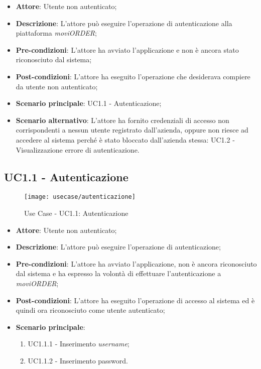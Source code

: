 \begin{itemize}
	\item \textbf{Attore}: Utente non autenticato;
	\item \textbf{Descrizione}: L'attore può eseguire l'operazione di autenticazione alla piattaforma \textit{moviORDER};
	\item \textbf{Pre-condizioni}: L'attore ha avviato l'applicazione e non è ancora stato riconosciuto dal sistema;
	\item \textbf{Post-condizioni}: L'attore ha eseguito l'operazione che desiderava compiere da utente non autenticato;
	\item \textbf{Scenario principale}: UC1.1 - Autenticazione;
	\item \textbf{Scenario alternativo}: L'attore ha fornito credenziali di accesso non corrispondenti a nessun utente registrato dall'azienda, oppure non riesce ad accedere al sistema perché è stato bloccato dall'azienda stessa: UC1.2 - Visualizzazione errore di autenticazione. 
\end{itemize}

\subsection{UC1.1 - Autenticazione}

\begin{figure}[!h] 
    \centering 
    \texttt{[image: usecase/autenticazione]} 
    \caption{Use Case - UC1.1: Autenticazione}
\end{figure}

\begin{itemize}
	\item \textbf{Attore}: Utente non autenticato;
	\item \textbf{Descrizione}: L'attore può eseguire l'operazione di autenticazione;
	\item \textbf{Pre-condizioni}: L'attore ha avviato l'applicazione, non è ancora riconosciuto dal sistema e ha espresso la volontà di effettuare l'autenticazione a \textit{moviORDER};
	\item \textbf{Post-condizioni}: L'attore ha eseguito l'operazione di accesso al sistema ed è quindi ora riconosciuto come utente autenticato;
	\item \textbf{Scenario principale}: 
		\begin{enumerate}
			\item UC1.1.1 - Inserimento \textit{username};
			\item UC1.1.2 - Inserimento password.
		\end{enumerate} 
\end{itemize}

